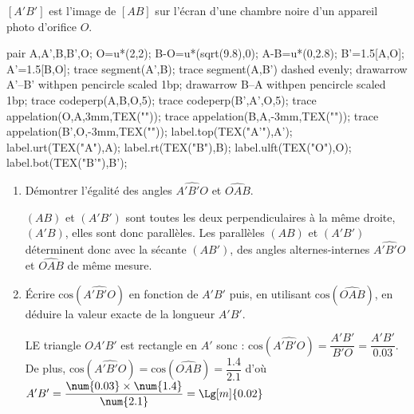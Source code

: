     $[A'B']$ est l'image de $[AB]$ sur l'écran d'une chambre noire d'un appareil photo d'orifice $O$.

    \begin{Geometrie}
        pair A,A',B,B',O;
        O=u*(2,2);
        B-O=u*(sqrt(9.8),0);
        A-B=u*(0,2.8);
        B'=1.5[A,O];
        A'=1.5[B,O];
        trace segment(A',B);
        trace segment(A,B') dashed evenly;
        drawarrow A'--B' withpen pencircle scaled 1bp;
        drawarrow B--A withpen pencircle scaled 1bp;
        trace codeperp(A,B,O,5);
        trace codeperp(B',A',O,5);
        trace appelation(O,A,3mm,TEX(""));
        trace appelation(B,A,-3mm,TEX(""));
        trace appelation(B',O,-3mm,TEX(""));
        label.top(TEX("A'"),A');
        label.urt(TEX("A"),A);
        label.rt(TEX("B"),B);
        label.ulft(TEX("O"),O);
        label.bot(TEX("B'"),B');
    \end{Geometrie}

    \begin{enumerate}
        \item Démontrer l'égalité des angles $\widehat{A'B'O}$ et $\widehat{OAB}$.

        {\color{red}$(AB)$ et $(A'B')$ sont toutes les deux perpendiculaires à la même droite, $(A'B)$, elles sont donc parallèles.
        Les parallèles $(AB)$ et $(A'B')$ déterminent donc avec la sécante $(AB')$, des angles alternes-internes $\widehat{A'B'O}$ et $\widehat{OAB}$ de même mesure.}
        \item Écrire $\text{cos}(\widehat{A'B'O})$ en fonction de $A'B'$ puis, en utilisant $\text{cos}(\widehat{OAB})$, en déduire la valeur exacte de la longueur $A'B'$.

        {\color{red}LE triangle $OA'B'$ est rectangle en $A'$ sonc : $\text{cos}(\widehat{A'B'O})=\dfrac{A'B'}{B'O}=\dfrac{A'B'}{\num{0.03}}$.
        De plus, $\text{cos}(\widehat{A'B'O})=\text{cos}(\widehat{OAB})=\dfrac{\num{1.4}}{\num{2.1}}$ d'où $A'B'=\dfrac{\num{0.03}\times\num{1.4}}{\num{2.1}}=\Lg[m]{0.02}$
        }
    \end{enumerate}
